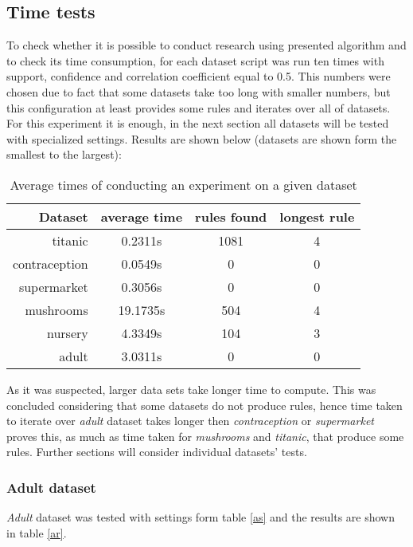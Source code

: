 \documentclass{article}
\begin{document}
	\subsection{Time tests}
	To check whether it is possible to conduct research using presented algorithm and to check its time consumption, for each dataset script was run ten times with support, confidence and correlation coefficient equal to 0.5. This numbers were chosen due to fact that some datasets take too long with smaller numbers, but this configuration at least provides some rules and iterates over all of datasets. For this experiment it is enough, in the next section all datasets will be tested with specialized settings. Results are shown below (datasets are shown form the smallest to the largest):
	\begin{table}[H]
		\centering
		\caption{Average times of conducting an experiment on a given dataset}
		\begin{tabular}{r||c |c |c }
			Dataset&average time&rules found&longest rule\\
			\hline
			\hline
			titanic&0.2311s&1081&4\\
			\hline
			contraception&0.0549s&0&0\\
			\hline
			supermarket&0.3056s&0&0\\
			\hline
			mushrooms&19.1735s&504&4\\
			\hline
			nursery&4.3349s&104&3\\
			\hline
			adult&3.0311s&0&0\\
		\end{tabular}
	\end{table}
	As it was suspected, larger data sets take longer time to compute. This was concluded considering that some datasets do not produce rules, hence time taken to iterate over \textit{adult} dataset takes longer then \textit{contraception} or \textit{supermarket} proves this, as much as time taken for \textit{mushrooms} and \textit{titanic}, that produce some rules. Further sections will consider individual datasets' tests.
	
	
	\subsubsection{Adult dataset}
	\textit{Adult} dataset was tested with settings form table \ref{as} and the results are shown in table \ref{ar}.
	
\end{document}

